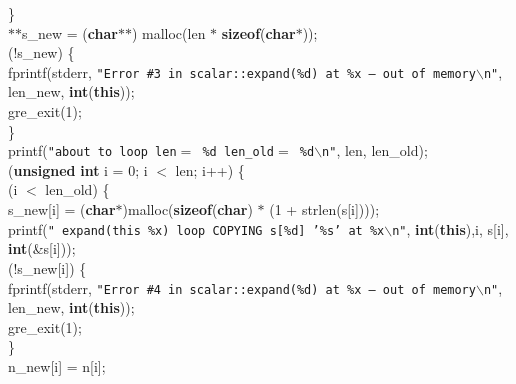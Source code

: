 \begin{flushleft}
\hspace*{4\indentation}\}\mbox{}\\
\hspace*{4\indentation}{\bf char} $\ast$$\ast$s\_new = ({\bf char}$\ast$$\ast$) malloc(len $\ast$ {\bf sizeof}({\bf char}$\ast$));\mbox{}\\
\hspace*{4\indentation}{\bf if} (!s\_new) \{\mbox{}\\
\hspace*{8\indentation}fprintf(stderr, {\tt"Error \#3 in scalar::expand(\%d) at \%x -- out of memory$\backslash$n"}, len\_new, {\bf int}({\bf this}));\mbox{}\\
\hspace*{8\indentation}gre\_exit(1);\mbox{}\\
\hspace*{4\indentation}\}\mbox{}\\
\hspace*{4\indentation}printf({\tt"about to loop len$=$ \%d  len\_old$=$ \%d$\backslash$n"}, len, len\_old);\mbox{}\\
\hspace*{4\indentation}{\bf for} ({\bf unsigned} {\bf int} i = 0; i $<$ len; i++) \{\mbox{}\\
\hspace*{8\indentation}{\bf if} (i $<$ len\_old) \{\mbox{}\\
\hspace*{12\indentation}s\_new[i] = ({\bf char}$\ast$)malloc({\bf sizeof}({\bf char}) $\ast$ (1 + strlen(s[i])));\mbox{}\\
\hspace*{12\indentation}printf({\tt"    expand(this \%x) loop COPYING s[\%d] '\%s' at \%x$\backslash$n"}, {\bf int}({\bf this}),i, s[i], {\bf int}(\&s[i]));\mbox{}\\
\hspace*{12\indentation}{\bf if} (!s\_new[i]) \{\mbox{}\\
\hspace*{16\indentation}fprintf(stderr, {\tt"Error \#4 in scalar::expand(\%d) at \%x -- out of memory$\backslash$n"}, len\_new, {\bf int}({\bf this}));\mbox{}\\
\hspace*{16\indentation}gre\_exit(1);\mbox{}\\
\hspace*{12\indentation}\}\mbox{}\\
\hspace*{12\indentation}n\_new[i] = n[i];\mbox{}\\

\end{flushleft}
